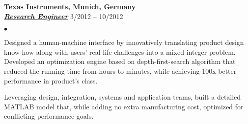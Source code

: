 \documentclass[11pt]{article}
\newcommand{\employer}[3]{{ \textbf{#1} \\ \underline{\textbf{\emph{#3}}} \hfill  #2\\  }}
\newenvironment{achievements}{\begin{list}{$\bullet$}{\topsep 0pt \itemsep -2pt}}{\vspace*{4pt}\end{list}}
\begin{document}
\employer{Texas Instruments, Munich, Germany}{3/2012 -- 10/2012}{Research Engineer}
	\begin{achievements}
        \item Designed a human-machine interface by innovatively translating product design know-how along with users' real-life challenges into a mixed integer problem. Developed an optimization engine based on depth-first-search algorithm that reduced the running time from hours to minutes, while achieving 100x better performance in product's class.
    \item Leveraging design, integration, systems and application teams, built a detailed MATLAB model that, while adding no extra manufacturing cost, optimized for conflicting performance goals.
    


\end{achievements}
\end{document}
